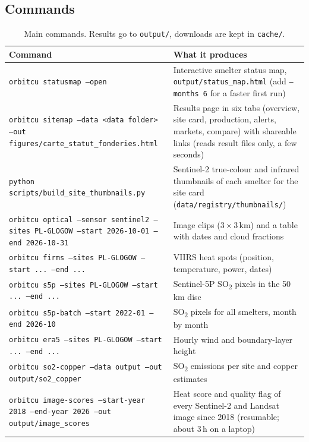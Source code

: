 \documentclass[10pt,a4paper]{article}
\newcommand{\SOtwo}{SO\textsubscript{2}}
\newcommand{\code}[1]{\texttt{\small #1}}
\begin{document}
\subsection*{Commands}
\begin{table}[H]
\centering\small
\begin{tabularx}{\textwidth}{@{}>{\raggedright\arraybackslash}p{6.4cm} X@{}}
\toprule
\textbf{Command} & \textbf{What it produces}\\
\midrule
\code{orbitcu statusmap --open} & Interactive smelter status map, \code{output/status\_map.html} (add \code{--months 6} for a faster first run)\\
\code{orbitcu sitemap --data <data folder> --out figures/carte\_statut\_fonderies.html} & Results page in six tabs (overview, site card, production, alerts, markets, compare) with shareable links (reads result files only, a few seconds)\\
\code{python scripts/build\_site\_thumbnails.py} & Sentinel-2 true-colour and infrared thumbnails of each smelter for the site card (\code{data/registry/thumbnails/})\\
\code{orbitcu optical --sensor sentinel2 --sites PL-GLOGOW --start 2026-10-01 --end 2026-10-31} & Image clips (3\,$\times$\,3\,km) and a table with dates and cloud fractions\\
\code{orbitcu firms --sites PL-GLOGOW --start ... --end ...} & VIIRS heat spots (position, temperature, power, dates)\\
\code{orbitcu s5p --sites PL-GLOGOW --start ... --end ...} & Sentinel-5P \SOtwo{} pixels in the 50\,km disc\\
\code{orbitcu s5p-batch --start 2022-01 --end 2026-10} & \SOtwo{} pixels for all smelters, month by month\\
\code{orbitcu era5 --sites PL-GLOGOW --start ... --end ...} & Hourly wind and boundary-layer height\\
\code{orbitcu so2-copper --data output --out output/so2\_copper} & \SOtwo{} emissions per site and copper estimates\\
\code{orbitcu image-scores --start-year 2018 --end-year 2026 --out output/image\_scores} & Heat score and quality flag of every Sentinel-2 and Landsat image since 2018 (resumable; about 3\,h on a laptop)\\
\bottomrule
\end{tabularx}
\caption{Main commands. Results go to \code{output/}, downloads are kept in \code{cache/}.}
\end{table}
\end{document}
